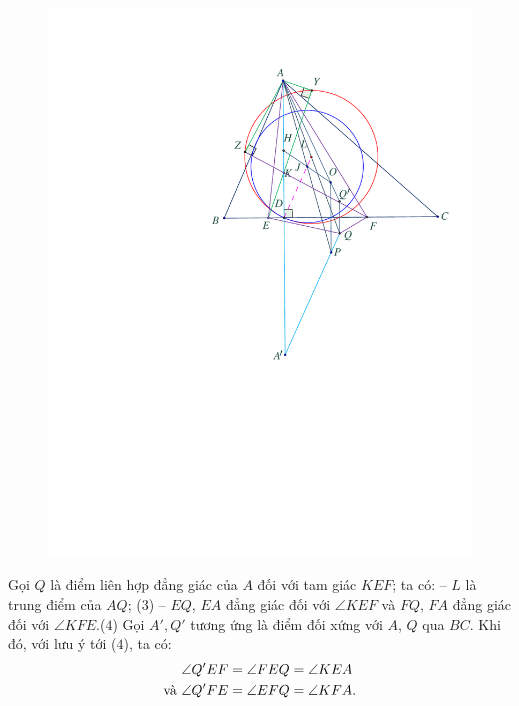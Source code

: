 \begin{multicols}{2}
	\begin{figure}[H]
		\vspace*{-10pt}
		\centering
		\captionsetup{labelformat= empty, justification=centering}
		\includegraphics[width= 1\linewidth]{P609}
		\vspace*{-15pt}
	\end{figure}
	Gọi $Q$ là điểm liên hợp đẳng giác của $A$ đối với tam giác $KEF$; ta có:
	\vskip 0.05cm
	-- $L$ là trung điểm của $AQ$; \hfill ($3$)
	\vskip 0.05cm
	-- $EQ$, $EA$ đẳng giác đối với $\angle KEF$ và $FQ$, $FA$ đẳng giác đối với      $\angle KFE$.\hfill    ($4$)
	\vskip 0.05cm
	Gọi  $A',Q'$ tương ứng là điểm đối xứng với $A$, $Q$ qua $BC$. Khi đó, với lưu ý tới ($4$), ta có:
	\begin{align*}
		&\angle Q'EF = \angle FEQ = \angle KEA \\
		\text{\color{black}và } &\angle Q'FE = \angle EFQ = \angle KFA.
	\end{align*}

\end{multicols}

